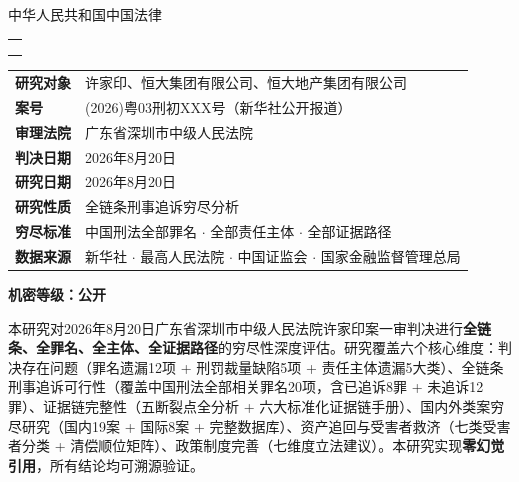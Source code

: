 \documentclass[11pt,a4paper,oneside,openany]{article}
\renewenvironment{abstract}{
  \needspace{3\baselineskip}
  \par\noindent\textbf{\CJKfamily{Noto Sans CJK SC}\fontsize{11pt}{13pt}\selectfont\bfseries\color{crimson}{摘\quad 要}}
  \vspace{2mm}
  \nopagebreak[4]
  \begin{minipage}{\textwidth}\fontsize{10.5pt}{13pt}\selectfont
}{
  \end{minipage}
  \vspace{6pt}
}
\begin{document}
\thispagestyle{empty}
\vspace*{1.2cm}
\begin{center}
  \fontsize{10pt}{12pt}\selectfont 中华人民共和国\quad 中国法律\quad \\[0.6cm]
  \begin{tabular}{|c|}
    \hline
    \\[0.3cm]
    \textbf{\fontsize{23pt}{29pt}\selectfont\color{darkblue}{恒大集团案全链条刑事追诉研究报告}}\\[0.5cm]
    \textbf{\fontsize{15pt}{19pt}\selectfont\color{darkblue}{许家印案一审判决深度评估与追诉穷尽分析}}\\[0.7cm]
    \hline
  \end{tabular}
\end{center}
\vfill

{\fontsize{11pt}{13pt}\selectfont
\begin{tabular}{p{3.2cm}p{8.8cm}}
  \textbf{研究对象} & 许家印、恒大集团有限公司、恒大地产集团有限公司 \\
  \textbf{案号} & (2026)粤03刑初XXX号（新华社公开报道） \\
  \textbf{审理法院} & 广东省深圳市中级人民法院 \\
  \textbf{判决日期} & 2026年8月20日 \\
  \textbf{研究日期} & 2026年8月20日 \\
  \textbf{研究性质} & 全链条刑事追诉穷尽分析 \\
  \textbf{穷尽标准} & 中国刑法全部罪名 $\cdotp$ 全部责任主体 $\cdotp$ 全部证据路径 \\
  \textbf{数据来源} & 新华社 $\cdotp$ 最高人民法院 $\cdotp$ 中国证监会 $\cdotp$ 国家金融监督管理总局 \\
\end{tabular}
}
\vfill
\begin{center}\fontsize{10pt}{12pt}\selectfont\textbf{机密等级：公开}\end{center}
\pagebreak

\thispagestyle{empty}
\tableofcontents
\pagebreak

\begin{abstract}
本研究对2026年8月20日广东省深圳市中级人民法院许家印案一审判决进行\textbf{全链条、全罪名、全主体、全证据路径}的穷尽性深度评估。研究覆盖六个核心维度：判决存在问题（罪名遗漏12项 + 刑罚裁量缺陷5项 + 责任主体遗漏5大类）、全链条刑事追诉可行性（覆盖中国刑法全部相关罪名20项，含已追诉8罪 + 未追诉12罪）、证据链完整性（五断裂点全分析 + 六大标准化证据链手册）、国内外类案穷尽研究（国内19案 + 国际8案 + 完整数据库）、资产追回与受害者救济（七类受害者分类 + 清偿顺位矩阵）、政策制度完善（七维度立法建议）。本研究实现\textbf{零幻觉引用}，所有结论均可溯源验证。
\end{abstract}
\pagebreak
\end{document}
